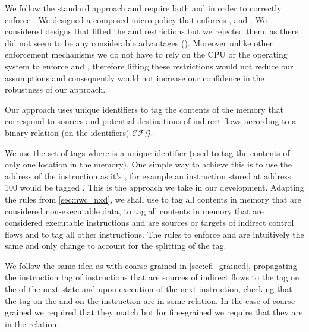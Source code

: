 We follow the standard approach and require both \NXD and \NWC in
order to correctly enforce \CFI. We designed a composed micro-policy
that enforces \NXD, \NWC and \CFI. We considered designs that lifted
the \NXD and \NWC restrictions but we rejected them, as there did not
seem to be any considerable advantages (). Moreover unlike
other \CFI enforcement mechanisms we do not have to rely on the CPU or
the operating system to enforce \NXD and \NWC, therefore lifting these
restrictions would not reduce our assumptions and consequently would
not increase our confidence in the robustness of our approach.



Our approach uses unique identifiers to tag the contents of the memory that
correspond to sources and potential destinations of indirect flows according to
a binary relation (on the identifiers) $\mathcal{CFG}$.

We use the set of tags 
where \id is a unique identifier (\IE used to tag the contents of only
one location in the memory). One simple way to achieve this is to use
the address of the instruction as it's \id, for example an instruction
stored at address 100 would be tagged . This is the
approach we take in our development. Adapting the rules from
\ref{sec:nwc_nxd}, we shall use \DATAname to tag all contents in
memory that are considered non-executable data,  to tag
all contents in memory that are considered executable instructions and
are sources or targets of indirect control flows and \INSTR{$\bot$} to
tag all other instructions. The rules to enforce \NWC and \NXD are
intuitively the same and only change to account for the splitting of
the \INSTRname tag.

We follow the same idea as with coarse-grained \CFI in
\cref{sec:cfi_grained}, propagating the instruction tag of
instructions that are sources of indirect flows to the tag on the \pc
of the next state and upon execution of the next instruction, checking
that the tag on the \pc and on the instruction are in some
relation. In the case of coarse-grained \CFI we required that they
match but for fine-grained \CFI we require that they are in the \CFG
relation.

